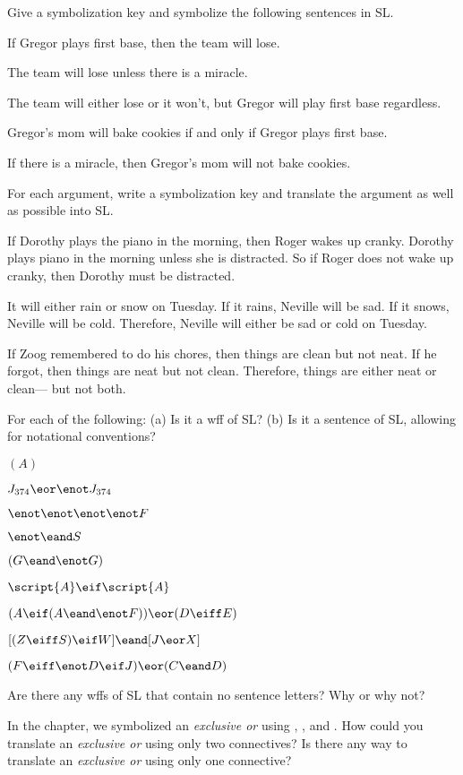 \problempart Give a symbolization key and symbolize the following sentences in SL.
\begin{earg}
\item If Gregor plays first base, then the team will lose.
\item The team will lose unless there is a miracle.
\item The team will either lose or it won't, but Gregor will play first base regardless.
\item Gregor's mom will bake cookies if and only if Gregor plays first base.
\item If there is a miracle, then Gregor's mom will not bake cookies.
\end{earg}


\problempart
For each argument, write a symbolization key and translate the argument as well as possible into SL.
\begin{earg}
\item If Dorothy plays the piano in the morning, then Roger wakes up cranky. Dorothy plays piano in the morning unless she is distracted. So if Roger does not wake up cranky, then Dorothy must be distracted.
\item It will either rain or snow on Tuesday. If it rains, Neville will be sad. If it snows, Neville will be cold. Therefore, Neville will either be sad or cold on Tuesday.
\item If Zoog remembered to do his chores, then things are clean but not neat. If he forgot, then things are neat but not clean. Therefore, things are either neat or clean--- but not both.
\end{earg}



\solutions
\problempart
\label{pr.wiffSL}
For each of the following: (a) Is it a wff of SL? (b) Is it a sentence of SL, allowing for notational conventions?
\begin{earg}
\item $(A)$
\item $J_{374} \eor \enot J_{374}$
\item $\enot \enot \enot \enot F$
\item $\enot \eand S$
\item $(G \eand \enot G)$
\item $\script{A} \eif \script{A}$
\item $(A \eif (A \eand \enot F)) \eor (D \eiff E)$
\item $[(Z \eiff S) \eif W] \eand [J \eor X]$
\item $(F \eiff \enot D \eif J) \eor (C \eand D)$
\end{earg}



\problempart
\begin{earg}
\item Are there any wffs of SL that contain no sentence letters? Why or why not?
\item In the chapter, we symbolized an \emph{exclusive or} using \eor, \eand, and \enot. How could you translate an \emph{exclusive or} using only two connectives? Is there any way to translate an \emph{exclusive or} using only one connective?
\end{earg}


